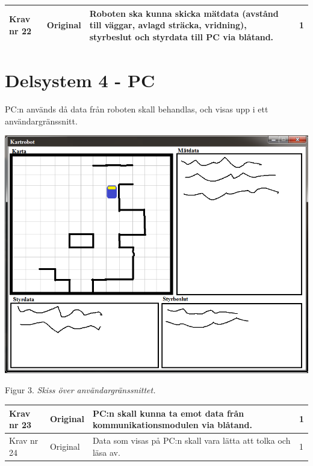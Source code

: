 \documentclass[11pt]{article}
\begin{document}
\begin{flushleft}
\begin{center}
\begin{longtable}{|l|l|p{.70\linewidth}|l|}
Krav nr 22 &
Original &
Roboten ska kunna skicka mätdata (avstånd till väggar, avlagd sträcka, vridning), styrbeslut och styrdata till PC via blåtand. &
1 \\ \hline

\end{longtable}
\end{center}

\section{Delsystem 4 - PC}

PC:n används då data från roboten skall behandlas, och visas upp i ett användargränssnitt.
\\

\begin{center}
\includegraphics[scale=0.5]{anvandargranssnitt}

Figur 3. \textit{Skiss över användargränssnittet.}
\end{center}

\begin{center}
\begin{longtable}{|l|l|p{.70\linewidth}|l|} \hline

Krav nr 23 &
Original &
PC:n skall kunna ta emot data från kommunikationsmodulen via blåtand. &
1 \\ \hline

Krav nr 24 &
Original &
Data som visas på PC:n skall vara lätta att tolka och läsa av. &
1 \\ \hline


\end{longtable}
\end{center}
\end{flushleft}
\end{document}
